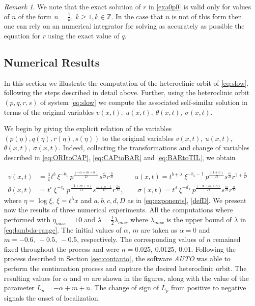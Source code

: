 \documentclass[usletter,11pt]{article}
\theoremstyle{remark}
\newtheorem{remark}{Remark}[section]
\begin{document}
\begin{remark}
We note that the exact solution of $r$ in \eqref{exa0p0} is valid only for values of $n$ of the form $n=\frac{1}{k}, \ k\ge 1, k\in\mathbb{Z}$. In the case that $n$ is not of this form then one can rely on an numerical integrator for solving as accurately as possible the equation for $r$ using the exact value of $q$. 
\end{remark}


\subsection{Numerical Results}\label{sec:numres}
In this section we illustrate the computation of the heteroclinic orbit of \eqref{eq:slow}, following the steps described in detail above. Further, using the heteroclinic orbit $(p,q,r,s)$ of system \eqref{eq:slow} we compute the associated self-similar solution in terms of the original variables $v(x,t), \ u(x,t),\ \theta(x,t),\ \sigma(x,t)$.
 
We begin by giving the explicit relation of the variables $(p(\eta),q(\eta),r(\eta),s(\eta))$ to the original variables $v(x,t), \ u(x,t)$, $\theta(x,t),\ \sigma(x,t)$. Indeed, collecting the transformations and change of variables described in \eqref{eq:ORItoCAP}, \eqref{eq:CAPtoBAR} and \eqref{eq:BARtoTIL}, we obtain 

\begin{equation}
\label{eq:pqrsTOvugs}
\begin{aligned}
v(x,t) &= \frac{1}{b} t^b\ \xi^{-b_1}\ p^{\frac{(-\alpha+m+n)}{D}} s^{\frac{\alpha}{D}} r^{\frac{n}{D}}\quad\qquad u(x,t) = t^{b+\lambda}\ \xi^{-b_1-1}\ p^{\frac{(1+\alpha)}{D}} s^{\frac{\alpha}{D}} r^{1+\frac{n}{D}} \\
\theta(x,t) &= t^c\ \xi^{-c_1}\ p^{\frac{(1+m+n)}{D}} s^{\frac{m+n-1}{D}} r^{\frac{2n}{D}},\qquad
\sigma(x,t) = t^d\ \xi^{-d_1}\ p^{\frac{(-\alpha+m+n)}{D}} s^{\frac{\alpha}{D}} r^{\frac{n}{D}}
\end{aligned}
\end{equation}
%
where $\eta=\log\xi,\ \xi=t^{\lambda} x$ and $a, b,  c,  d,  D$ as in \eqref{eq:exponents}, \eqref{defD}.   We present now the results of  three numerical experiments. All the computations where performed with $\eta_{max}=10$ and $\lambda = \frac{1}{2}\lambda_{max}$ where $\lambda_{max}$ is the upper bound of $\lambda$ in \eqref{eq:lambda-range}. The initial values of $\alpha$, $m$ are taken as $\alpha=0$ and $m=-0.6, \ -0.5, \ -0.5$, respectively.  
The corresponding values of $n$ remained fixed throughout the process and were $n=0.025, \ 0.0125, \ 0.01$. 
Following the process  described in Section  \ref{sec:contauto}, the software \emph{AUTO} was able to perform the continuation process 
and capture the desired heteroclinic orbit. The resulting values for 
$\alpha$ and $m$ are shown in the figures, along with the value of the parameter $L_p = -\alpha + m + n$.  The change of sign of $L_p$ from positive to negative signals the onset of localization. 
 
\end{document}
